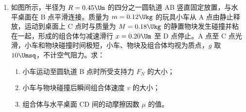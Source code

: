 \documentclass[\gkver]{gaokaozhenti}
\begin{document}
\begin{enumerate}
{流过电阻的最大电流约为 $I_{max} = \frac{E}{R_{x}} = \frac{3}{5} \UA = 0.6 \UA$，为了减小误差，电流表选用量程为 $0.6 \UA$ 的 C。

（2）电流表和电压表示数都为零，在不可能是 4、5 导线内部断开，该同学用多用电表的直流电压挡测量电源正极 a 与接线柱 b 间电压，读数为零；测量 a 与接线柱 c 间电压，读数不为零，则可以确定导线 6 内部断开。

（3）根据电路图可得
$I = \frac{U}{R_{\mathrm{V}}} + \frac{U}{R_{x}}$

整理可得
$U = \frac{R_{\mathrm{V}}R_{x}}{R_{x} + R_{\mathrm{V}}}I$

则 $\frac{R_{\mathrm{V}}R_{x}}{R_{x} + R_{\mathrm{V}}} = k$

可得 $R_{x} = \frac{kR_{\mathrm{V}}}{R_{\mathrm{V}} - k}$
}

\item
如图所示，半径为 $R = 0.45 \Um$ 的四分之一圆轨道 AB 竖直固定放置，与水平桌面在 B 点平滑连接。质量为 $m = 0.12 \Ukg$ 的玩具小车从 A 点由静止释放，运动到桌面上 C 点时与质量为 $M = 0.18 \Ukg$ 的静置物块发生碰撞并粘在一起，形成的组合体匀减速滑行 $x = 0.20 \Um$ 至 D 点停止。A 点至 C 点光滑，小车和物块碰撞时间极短，小车、物块及组合体均视为质点，$g$ 取 $10 \Umsq$，不计空气阻力。求：
\begin{enumerate}
\item
小车运动至圆轨道 B 点时所受支持力 $F_{N}$ 的大小；
\item
小车与物块碰撞后瞬间组合体速度 $v$ 的大小；
\item
组合体与水平桌面 CD 间的动摩擦因数 $\mu$ 的值。
\end{enumerate}


\end{enumerate}
\end{document}
